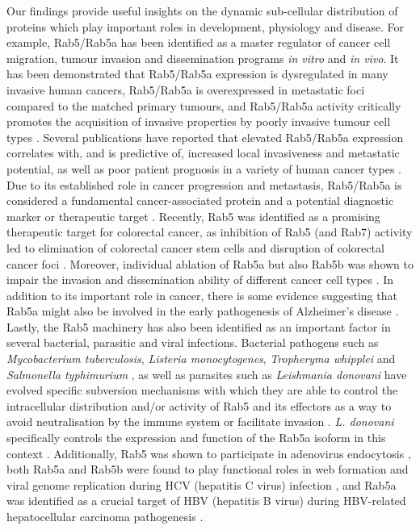 \documentclass[12pt,english]{article}
\begin{document}
Our findings provide useful insights on the dynamic sub-cellular distribution of proteins which play important roles in development, physiology and disease. For example, Rab5/Rab5a has been identified as a master regulator of cancer cell migration, tumour invasion and dissemination programs \textit{in vitro} and \textit{in vivo}. It has been demonstrated that Rab5/Rab5a expression is dysregulated in many invasive human cancers, Rab5/Rab5a is overexpressed in metastatic foci compared to the matched primary tumours, and Rab5/Rab5a activity critically promotes the acquisition of invasive properties by poorly invasive tumour cell types \citep{Torres::2010,Liu::2011,Liu::2015, Mendoza::2013,Frittoli::2014,Diaz::2014, Saitoh::2017}. Several publications have reported that elevated Rab5/Rab5a expression correlates with, and is predictive of, increased local invasiveness and metastatic potential, as well as poor patient prognosis in a variety of human cancer types \citep{Yu::1999,Fukui::2007,Zhao::2010,Yang::2011,Mendoza::2013, Frittoli::2014,Diaz::2014, Igarashi::2017}. Due to its established role in cancer progression and metastasis, Rab5/Rab5a is considered a fundamental cancer-associated protein and a potential diagnostic marker or therapeutic target \citep{Frittoli::2014, Igarashi::2017}. Recently, Rab5 was identified as a promising therapeutic target for colorectal cancer, as inhibition of Rab5 (and Rab7) activity led to elimination of colorectal cancer stem cells and disruption of colorectal cancer foci \citep{Takeda::2019}. Moreover, individual ablation of Rab5a but also Rab5b was shown to impair the invasion and dissemination ability of different cancer cell types \citep{Frittoli::2014}. In addition to its important role in cancer, there is some evidence suggesting that Rab5a might also be involved in the early pathogenesis of Alzheimer's disease \citep{Cataldo::1997,Cataldo::2000, Rosenfeld::2001}. Lastly, the Rab5 machinery has also been identified as an important factor in several bacterial, parasitic and viral infections. Bacterial pathogens such as \textit{Mycobacterium tuberculosis}, \textit{Listeria monocytogenes}, \textit{Tropheryma whipplei} and \textit{Salmonella typhimurium} \citep{Madan::2008}, as well as parasites such as \textit{Leishmania donovani} have evolved specific subversion mechanisms with which they are able to control the intracellular distribution and/or activity of Rab5 and its effectors as a way to avoid neutralisation by the immune system or facilitate invasion \citep{Verma::2017}. \textit{L. donovani} specifically controls the expression and function of the Rab5a isoform in this context \citep{Verma::2017}. Additionally, Rab5 was shown to participate in adenovirus endocytosis \citep{Rauma::1999}, both Rab5a and Rab5b were found to play functional roles in web formation and viral genome replication during HCV (hepatitis C virus) infection \citep{Stone::2007}, and Rab5a was identified as a crucial target of HBV (hepatitis B virus) during HBV-related hepatocellular carcinoma  pathogenesis \citep{Sheng::2014}.
\end{document}
